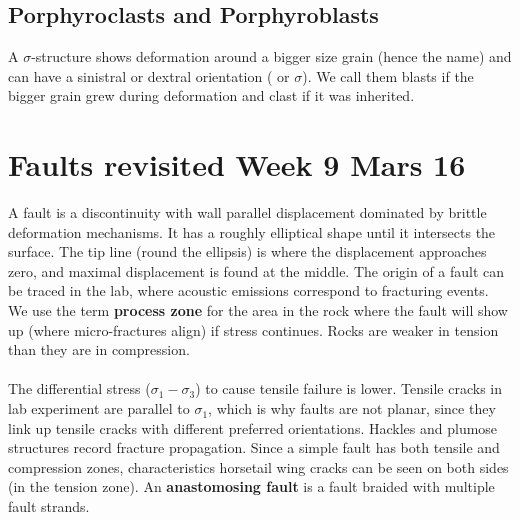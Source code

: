 \documentclass[12pt,a4paper]{report}
\begin{document}
\subsection*{Porphyroclasts and Porphyroblasts}
A $\sigma$-structure shows deformation around a bigger size grain (hence the name) and can have a sinistral or dextral orientation ( or $\sigma$).
We call them blasts if the bigger grain grew during deformation and clast if it was inherited.

\section*{Faults revisited Week 9 Mars 16}
A fault is a discontinuity with wall parallel displacement dominated by brittle deformation mechanisms.
It has a roughly elliptical shape until it intersects the surface.
The tip line (round the ellipsis) is where the displacement approaches zero, and maximal displacement is found at the middle.
The origin of a fault can be traced in the lab, where acoustic emissions correspond to fracturing events.
We use the term \textbf{process zone} for the area in the rock where the fault will show up (where micro-fractures align) if stress continues.
Rocks are weaker in tension than they are in compression.\\
\\
The differential stress ($\sigma_1 - \sigma_3 $) to cause tensile failure is lower.
Tensile cracks in lab experiment are parallel to $\sigma_1$, which is why faults are not planar, since they link up tensile cracks with different preferred orientations.
Hackles and plumose structures record fracture propagation.
Since a simple fault has both tensile and compression zones, characteristics horsetail wing cracks can be seen on both sides (in the tension zone).
An \textbf{anastomosing fault} is a fault braided with multiple fault strands.
\end{document}
